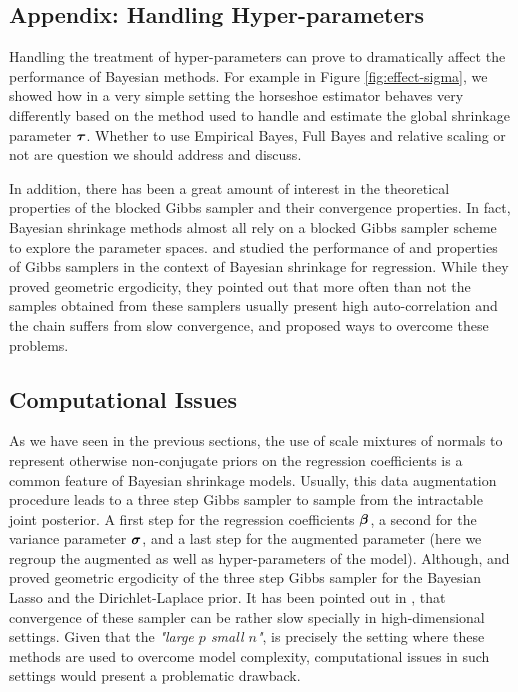 \documentclass[10pt]{article}
\begin{document}
\begin{appendix}
\section{Appendix: Handling Hyper-parameters}\label{sec:hyper}

Handling the treatment of hyper-parameters can prove to dramatically affect the performance of Bayesian  methods. For example in Figure \ref{fig:effect-sigma}, we showed how in a very simple setting the horseshoe estimator behaves very differently based on the method used to handle and estimate the global shrinkage parameter $\boldsymbol{\tau}$. Whether to use Empirical Bayes, Full Bayes and relative scaling or not are question we should address and discuss.

In addition, there has been a great amount of interest in the theoretical properties of the blocked Gibbs sampler and their convergence properties. In fact, Bayesian shrinkage methods almost all rely on a blocked Gibbs sampler scheme to explore the parameter spaces. \cite{Rajaratnam2017Gibbs} and \cite{Khare2014ergodicity} studied the performance of and properties of Gibbs samplers in the context   of Bayesian shrinkage for regression. While they proved geometric ergodicity, they  pointed out that more often than not the samples obtained from these samplers usually present high auto-correlation and the chain suffers from slow convergence, and proposed   ways to overcome these problems.

\subsection{Computational Issues}

As we have seen in the previous sections, the use of scale mixtures of normals to represent otherwise non-conjugate priors on the regression coefficients is a common feature of Bayesian shrinkage models. Usually, this data augmentation procedure leads to a three step Gibbs sampler to sample from the intractable joint posterior. A first step for the regression coefficients $\boldsymbol{\beta}$, a second for the variance parameter $\boldsymbol{\sigma}$, and a last step for the augmented parameter (here we regroup the augmented as well as hyper-parameters of the model). Although, \cite{Khare2013blasso_ergodicity} and \cite{Khare2014ergodicity} proved geometric ergodicity of the three step Gibbs sampler for the Bayesian Lasso and the Dirichlet-Laplace prior. It has been pointed out in \cite{Rajaratnam2017Gibbs}, that convergence of these sampler can be rather slow specially in high-dimensional settings. Given that the \textit{"large $p$ small $n$"}, is precisely the setting where these methods are used to overcome model complexity, computational issues in such settings would present a problematic drawback. 


\end{appendix}
\end{document}
